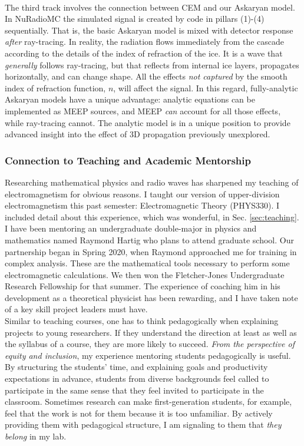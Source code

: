 \documentclass[../../../main.tex]{subfiles}
\begin{document}
\\
\vspace{0.25cm}
The third track involves the connection between CEM and our Askaryan model.  In NuRadioMC the simulated signal is created by code in pillars (1)-(4) sequentially.  That is, the basic Askaryan model is mixed with detector response \textit{after} ray-tracing.  In reality, the radiation flows immediately from the cascade according to the details of the index of refraction of the ice.  It is a wave that \textit{generally} follows ray-tracing, but that reflects from internal ice layers, propagates horizontally, and can change shape.  All the effects \textit{not captured} by the smooth index of refraction function, $n$, will affect the signal.  In this regard, fully-analytic Askaryan models have a unique advantage: analytic equations can be implemented as MEEP sources, and MEEP \textit{can} account for all those effects, while ray-tracing cannot.  The analytic model is in a unique position to provide advanced insight into the effect of 3D propagation previously unexplored.

\subsubsection{Connection to Teaching and Academic Mentorship}

Researching mathematical physics and radio waves has sharpened my teaching of electromagnetism for obvious reasons.  I taught our version of upper-division electromagnetism this past semester: Electromagnetic Theory (PHYS330).  I included detail about this experience, which was wonderful, in Sec. \ref{sec:teaching}.
\\
\vspace{0.25cm}
I have been mentoring an undergraduate double-major in physics and mathematics named Raymond Hartig who plans to attend graduate school.  Our partnership began in Spring 2020, when Raymond approached me for training in complex analysis.  These are the mathematical tools necessary to perform some electromagnetic calculations.  We then won the Fletcher-Jones Undergraduate Research Fellowship for that summer.  The experience of coaching him in his development as a theoretical physicist has been rewarding, and I have taken note of a key skill project leaders must have.
\\
\vspace{0.25cm}
Similar to teaching courses, one has to think pedagogically when explaining projects to young researchers.  If they understand the direction at least as well as the syllabus of a course, they are more likely to succeed.  \textit{From the perspective of equity and inclusion}, my experience mentoring students pedagogically is useful.  By structuring the students' time, and explaining goals and productivity expectations in advance, students from diverse backgrounds feel called to participate in the same sense that they feel invited to participate in the classroom.  Sometimes research can make first-generation students, for example, feel that the work is not for them because it is too unfamiliar.  By actively providing them with pedagogical structure, I am signaling to them that \textit{they belong} in my lab.
\end{document}
